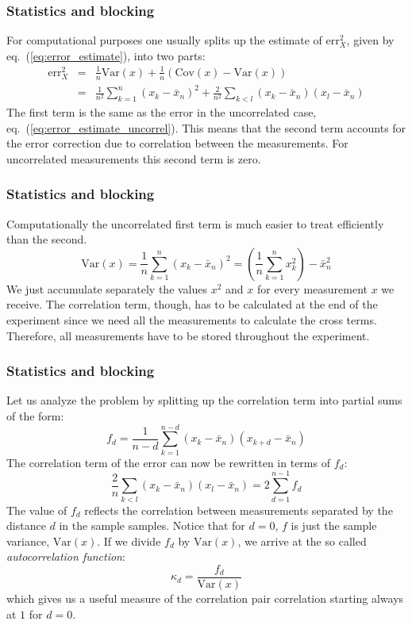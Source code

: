 \documentclass[compress]{beamer}
\newcommand{\bea}{\begin{eqnarray}}
\newcommand{\eea}{\end{eqnarray}}
\newcommand{\bdm}{\begin{displaymath}}
\newcommand{\edm}{\end{displaymath}}
\newcommand{\cov}[0]{\mathrm{Cov}}   %
\newcommand{\var}[0]{\mathrm{Var}}   %
\begin{document}
\frame
{
  \frametitle{Statistics and blocking}
\begin{small}
{\scriptsize
For computational purposes one usually splits up the estimate of
$\mathrm{err}_X^2$, given by eq.~(\ref{eq:error_estimate}), into two
parts:
\bea
\mathrm{err}_X^2 &=&
\frac{1}{n}\var(x) + \frac{1}{n}(\cov(x)-\var(x))\nonumber\\&=&
\frac{1}{n^2}\sum_{k=1}^n (x_k - \bar x_n)^2 +
\frac{2}{n^2}\sum_{k<l} (x_k - \bar x_n)(x_l - \bar x_n)
\label{eq:error_estimate_split_up}
\eea
The first term is the same as the error in the uncorrelated case,
eq.~(\ref{eq:error_estimate_uncorrel}). This means that the second
term accounts for the error correction due to correlation between the
measurements. For uncorrelated measurements this second term is zero.
}
\end{small}
}

\frame
{
  \frametitle{Statistics and blocking}
\begin{small}
{\scriptsize
Computationally the uncorrelated first term is much easier to treat
efficiently than the second.
\bdm
\var(x) = \frac{1}{n}\sum_{k=1}^n (x_k - \bar x_n)^2 =
\left(\frac{1}{n}\sum_{k=1}^n x_k^2\right) - \bar x_n^2
\edm
We just accumulate separately the values $x^2$ and $x$ for every
measurement $x$ we receive. The correlation term, though, has to be
calculated at the end of the experiment since we need all the
measurements to calculate the cross terms. Therefore, all measurements
have to be stored throughout the experiment.
}
\end{small}
}

\frame
{
  \frametitle{Statistics and blocking}
\begin{small}
{\scriptsize
Let us analyze the problem by splitting up the correlation term into
partial sums of the form:
\bdm
f_d = \frac{1}{n-d}\sum_{k=1}^{n-d}(x_k - \bar x_n)(x_{k+d} - \bar x_n)
\edm
The correlation term of the error can now be rewritten in terms of
$f_d$:
\bdm
\frac{2}{n}\sum_{k<l} (x_k - \bar x_n)(x_l - \bar x_n) =
2\sum_{d=1}^{n-1} f_d
\edm
The value of $f_d$ reflects the correlation between measurements
separated by the distance $d$ in the sample samples.  Notice that for
$d=0$, $f$ is just the sample variance, $\var(x)$. If we divide $f_d$
by $\var(x)$, we arrive at the so called \emph{autocorrelation
  function}:
\bdm
\kappa_d = \frac{f_d}{\var(x)}
\edm
which gives us a useful measure of the correlation pair correlation
starting always at $1$ for $d=0$.
}
\end{small}
}
\end{document}
